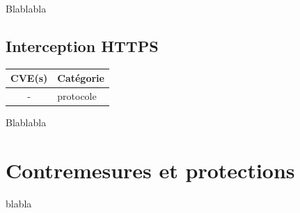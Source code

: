 \vspace{1em}

Blablabla \cite{sslstrip-website}




\subsection{Interception HTTPS}

\begin{tabularx}{0.96\textwidth}{|c|X|}
  \hline
  \textbf{CVE(s)} & \textbf{Catégorie} \\
  \hline
  - & protocole \\
  \hline
\end{tabularx}

Blablabla \cite{https-interception}



\section{Contremesures et protections}

blabla
